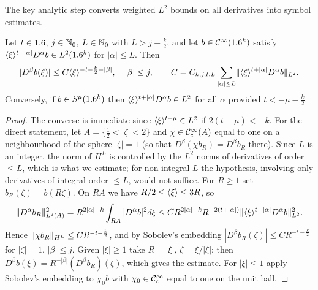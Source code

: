 The key analytic step converts weighted $L^2$ bounds on all derivatives into
symbol estimates.

\begin{lemma}\label{conormal:lem:L2-sup}
  Let $t\in1.6$, $j\in\mathbb{N}_0$, $L\in\mathbb{N}_0$ with $L>j+\frac k2$, and let $b\in\mathcal{C}^\infty(1.6^k)$ satisfy
  $\langle \xi\rangle^{t+|\alpha|}D^\alpha b\in L^2(1.6^k)$ for $|\alpha|\le L$.  Then
  \begin{equation*}
    |D^\beta b(\xi)|\le C\langle \xi\rangle^{-t-\frac k2-|\beta|},\quad |\beta|\le j,
    \qquad C=C_{k,j,t,L}\sum_{|\alpha|\le L}\lVert \langle \xi\rangle^{t+|\alpha|}D^\alpha b\rVert_{L^2}.
  \end{equation*}
  Conversely, if $b\in S^\mu(1.6^k)$ then $\langle \xi\rangle^{t+|\alpha|}D^\alpha b\in L^2$
  for all $\alpha$ provided $t<-\mu-\frac k2$.
\end{lemma}
\begin{proof}
  The converse is immediate since $\langle \xi\rangle^{t+\mu}\in L^2$ if $2(t+\mu)<-k$.
  For the direct statement, let $A=\{\frac12<|\zeta|<2\}$ and $\chi\in\mathcal{C}^\infty_{\mathrm{c}}(A)$
  equal to one on a neighbourhood of the sphere $|\zeta|=1$ (so that
  $D^\beta(\chi b_R)=D^\beta b_R$ there).  Since $L$ is an integer, the norm of
  $H^L$ is controlled by the $L^2$ norms of derivatives of order $\le L$,
  which is what we estimate; for non-integral $L$ the hypothesis, involving
  only derivatives of integral order $\le L$, would not suffice.  For $R\ge1$ set $b_R(\zeta)=b(R\zeta)$.  On
  $RA$ we have $R/2\le\langle \xi\rangle\le3R$, so
  \begin{equation*}
    \lVert D^\alpha b_R\rVert^2_{L^2(A)}=R^{2|\alpha|-k}\int_{RA}|D^\alpha b|^2d\xi
    \le CR^{2|\alpha|-k}R^{-2(t+|\alpha|)}\lVert \langle \xi\rangle^{t+|\alpha|}D^\alpha b\rVert^2_{L^2}.
  \end{equation*}
  Hence $\lVert \chi b_R\rVert_{H^L}\le CR^{-t-\frac k2}$, and by Sobolev's embedding
  $|D^\beta b_R(\zeta)|\le CR^{-t-\frac k2}$ for $|\zeta|=1$, $|\beta|\le j$.
  Given $|\xi|\ge1$ take $R=|\xi|$, $\zeta=\xi/|\xi|$: then $D^\beta b(\xi)=
  R^{-|\beta|}(D^\beta b_R)(\zeta)$, which gives the estimate.  For $|\xi|\le1$
  apply Sobolev's embedding to $\chi_0b$ with $\chi_0\in\mathcal{C}^\infty_{\mathrm{c}}$ equal to one on the
  unit ball.
\end{proof}

